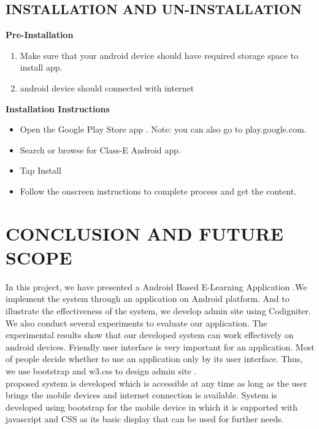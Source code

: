 \documentclass[oneside,a4paper,12pt]{report}
\begin{document}
\section{INSTALLATION AND UN-INSTALLATION}

\textbf{Pre-Installation}
\begin{enumerate}
\item Make sure that your android device should have required storage space to install app.
\item android device should connected with internet
\end{enumerate} 

\textbf{Installation Instructions}
\begin{enumerate}
\begin{itemize}
\item Open the Google Play Store app . Note: you can also go to play.google.com.

\item Search or browse for Class-E Android app.
 
\item Tap Install 

\item Follow the onscreen instructions to complete process and get the content.


\end{itemize}



\end{enumerate} 

\newpage



     
\chapter{CONCLUSION AND FUTURE SCOPE}
\newpage
\hspace*{0.3in}
In this project, we have presented a Android Based E-Learning Application .We implement the  system through an application on Android platform. And to illustrate the effectiveness of the system, we develop admin site  using Codigniter.\\
 We also conduct several experiments to evaluate our application.  The experimental
results show that our developed system can work effectively on android devices.  Friendly user interface is very  important  for  an  application.   Most  of  people  decide  whether  to  use an application only by its user interface.  Thus, we use bootstrap and w3.css to design admin site .\\
proposed system is developed which is accessible at any time as long as
the user brings the mobile devices and internet connection is available.
System is developed using bootstrap for the mobile device in which it is
supported with javascript and CSS as its basic display that can be used
for further needs.
\\ 
\end{document}
